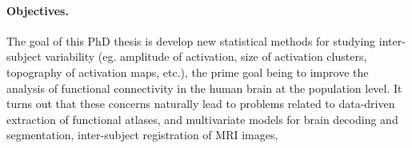 \paragraph{Objectives.} The goal of this PhD thesis is develop new statistical methods for studying inter-subject variability (eg. amplitude of activation, size of activation clusters, topography of activation maps, etc.), the prime goal being to improve the analysis of functional connectivity in the human brain at the population level. It turns out that these concerns naturally lead to problems related to data-driven
extraction of functional atlases, and multivariate models for brain decoding and segmentation, inter-subject registration of MRI images,




